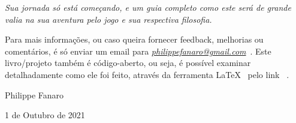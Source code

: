 \bigskip
\bigskip

\emph{Sua jornada só está começando, e um guia completo como este será de grande valia na sua aventura pelo jogo e sua respectiva filosofia.}

\bigskip
\bigskip

Para mais informações, ou caso queira fornecer feedback, melhorias ou comentários, é só enviar um email para \emph{\href{mailto:philippefanaro@gmail.com}{philippefanaro@gmail.com}}~\cite{fanaro_email}. Este livro/projeto também é código-aberto, ou seja, é possível examinar detalhadamente como ele foi feito, através da ferramenta \LaTeX~\cite{latex} pelo link \href{https://github.com/FanaroEngineering/traducao_como_jogar_go}{}~\cite{repo_github}.

\bigskip
\bigskip

Philippe Fanaro

1 de Outubro de 2021